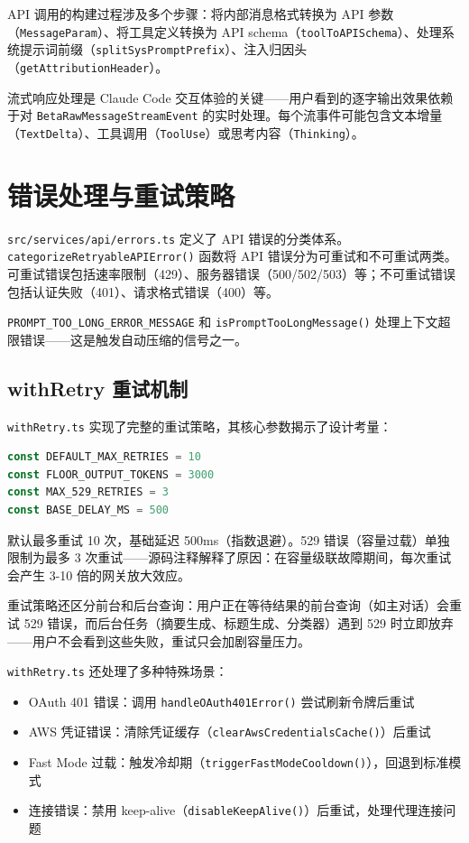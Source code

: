 API 调用的构建过程涉及多个步骤：将内部消息格式转换为 API 参数（\texttt{MessageParam}）、将工具定义转换为 API schema（\texttt{toolToAPISchema}）、处理系统提示词前缀（\texttt{splitSysPromptPrefix}）、注入归因头（\texttt{getAttributionHeader}）。

流式响应处理是 Claude Code 交互体验的关键——用户看到的逐字输出效果依赖于对 \texttt{BetaRawMessageStreamEvent} 的实时处理。每个流事件可能包含文本增量（\texttt{TextDelta}）、工具调用（\texttt{ToolUse}）或思考内容（\texttt{Thinking}）。

\section{错误处理与重试策略}

\texttt{src/services/api/errors.ts} 定义了 API 错误的分类体系。\texttt{categorizeRetryableAPIError()} 函数将 API 错误分为可重试和不可重试两类。可重试错误包括速率限制（429）、服务器错误（500/502/503）等；不可重试错误包括认证失败（401）、请求格式错误（400）等。

\texttt{PROMPT\_TOO\_LONG\_ERROR\_MESSAGE} 和 \texttt{isPromptTooLongMessage()} 处理上下文超限错误——这是触发自动压缩的信号之一。

\subsection{withRetry 重试机制}

\texttt{withRetry.ts} 实现了完整的重试策略，其核心参数揭示了设计考量：

\begin{lstlisting}[language=TypeScript]
const DEFAULT_MAX_RETRIES = 10
const FLOOR_OUTPUT_TOKENS = 3000
const MAX_529_RETRIES = 3
const BASE_DELAY_MS = 500
\end{lstlisting}

默认最多重试 10 次，基础延迟 500ms（指数退避）。529 错误（容量过载）单独限制为最多 3 次重试——源码注释解释了原因：在容量级联故障期间，每次重试会产生 3-10 倍的网关放大效应。

重试策略还区分前台和后台查询：用户正在等待结果的前台查询（如主对话）会重试 529 错误，而后台任务（摘要生成、标题生成、分类器）遇到 529 时立即放弃——用户不会看到这些失败，重试只会加剧容量压力。

\texttt{withRetry.ts} 还处理了多种特殊场景：

\begin{itemize}
  \item OAuth 401 错误：调用 \texttt{handleOAuth401Error()} 尝试刷新令牌后重试
  \item AWS 凭证错误：清除凭证缓存（\texttt{clearAwsCredentialsCache()}）后重试
  \item Fast Mode 过载：触发冷却期（\texttt{triggerFastModeCooldown()}），回退到标准模式
  \item 连接错误：禁用 keep-alive（\texttt{disableKeepAlive()}）后重试，处理代理连接问题
\end{itemize}

